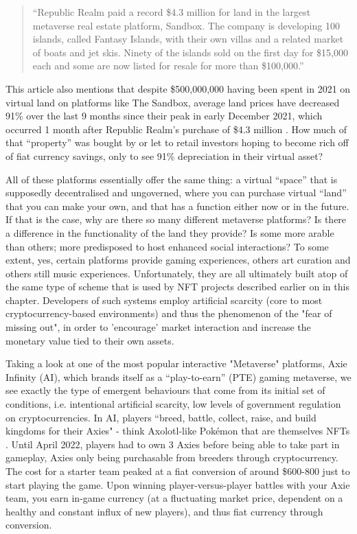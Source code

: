 \begin{quote}
    “Republic Realm paid a record \$4.3 million for land in the largest metaverse real estate platform, Sandbox. The company is developing 100 islands, called Fantasy Islands, with their own villas and a related market of boats and jet skis. Ninety of the islands sold on the first day for \$15,000 each and some are now listed for resale for more than \$100,000.” \citep[]{frank2022}
\end{quote}
This article also mentions that despite \$500,000,000 having been spent in 2021 on virtual land on platforms like The Sandbox, average land prices have decreased 91\% over the last 9 months since their peak in early December 2021, which occurred 1 month after Republic Realm’s purchase of \$4.3 million \citep[]{kane2022}. How much of that “property” was bought by or let to retail investors hoping to become rich off of fiat currency savings, only to see 91\% depreciation in their virtual asset? 

All of these platforms essentially offer the same thing: a virtual “space” that is supposedly decentralised and ungoverned, where you can purchase virtual “land” that you can make your own, and that has a function either now or in the future. If that is the case, why are there so many different metaverse platforms? Is there a difference in the functionality of the land they provide? Is some more arable than others; more predisposed to host enhanced social interactions? To some extent, yes, certain platforms provide gaming experiences, others art curation and others still music experiences. Unfortunately, they are all ultimately built atop of the same type of scheme that is used by NFT projects described earlier on in this chapter. Developers of such systems employ artificial scarcity (core to most cryptocurrency-based environments) and thus the phenomenon of the "fear of missing out", in order to 'encourage' market interaction and increase the monetary value tied to their own assets.

Taking a look at one of the most popular interactive "Metaverse" platforms, Axie Infinity (AI), which brands itself as a “play-to-earn” (PTE) gaming metaverse, we see exactly the type of emergent behaviours that come from its initial set of conditions, i.e. intentional artificial scarcity, low levels of government regulation on cryptocurrencies. In AI, players “breed, battle, collect, raise, and build kingdoms for their Axies" - think Axolotl-like Pokémon that are themselves NFTs \citep[]{skymavis2022}. Until April 2022, players had to own 3 Axies before being able to take part in gameplay, Axies only being purchasable from breeders through cryptocurrency. The cost for a starter team peaked at a fiat conversion of around \$600-800 just to start playing the game. Upon winning player-versus-player battles with your Axie team, you earn in-game currency (at a fluctuating market price, dependent on a healthy and constant influx of new players), and thus fiat currency through conversion.

